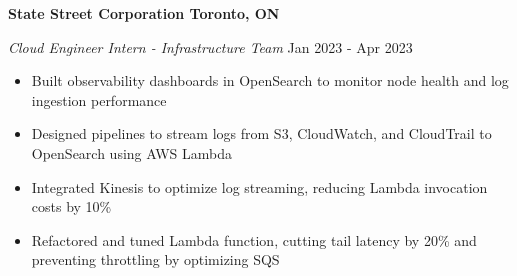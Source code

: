 \textbf{State Street Corporation \hfill Toronto, ON}\par
\textit{Cloud Engineer Intern - Infrastructure Team} \hfill Jan 2023 - Apr 2023

\begin{itemize}
  \item Built observability dashboards in OpenSearch to monitor node health and log ingestion performance
  \item Designed pipelines to stream logs from S3, CloudWatch, and CloudTrail to OpenSearch using AWS Lambda
  \item Integrated Kinesis to optimize log streaming, reducing Lambda invocation costs by 10\%
  \item Refactored and tuned Lambda function, cutting tail latency by 20\% and preventing throttling by optimizing SQS
\end{itemize}
\vspace{0.2cm} \par
